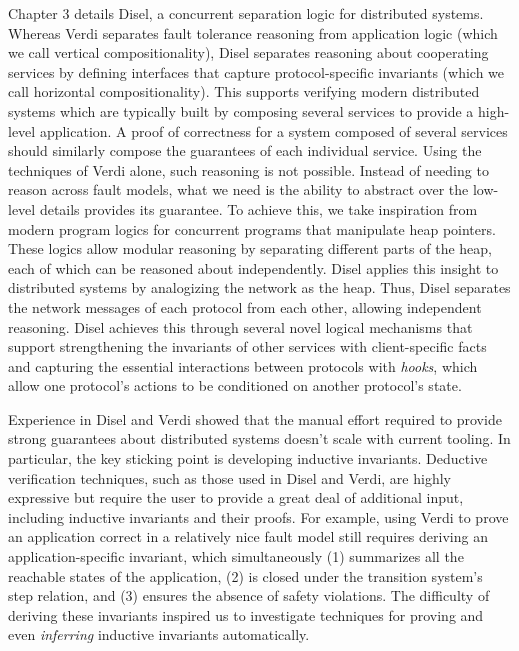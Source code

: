 Chapter 3 details Disel, a concurrent separation logic for distributed
systems.  Whereas Verdi separates fault tolerance reasoning from
application logic (which we call vertical compositionality), Disel
separates reasoning about cooperating services by defining interfaces
that capture protocol-specific invariants (which we call horizontal
compositionality).  This supports verifying modern distributed systems
which are typically built by composing several services to provide a
high-level application.  A proof of correctness for a system composed
of several services should similarly compose the guarantees of each
individual service. Using the techniques of Verdi alone, such reasoning
is not possible. Instead of needing to reason across fault models,
what we need is the ability to abstract over the low-level details
provides its guarantee. To achieve this, we take inspiration from
modern program logics for concurrent programs that manipulate
heap pointers. These logics allow modular reasoning by separating
different parts of the heap, each of which can be reasoned about
independently. Disel applies this insight to distributed systems
by analogizing the network as the heap. Thus, Disel separates
the network messages of each protocol from each other, allowing
independent reasoning. Disel achieves this through several
novel logical mechanisms that support strengthening the invariants
of other services with client-specific facts and capturing the
essential interactions between protocols with \emph{hooks}, which
allow one protocol's actions to be conditioned on another protocol's
state.

Experience in Disel and Verdi showed that the manual effort required
to provide strong guarantees about distributed systems doesn't scale
with current tooling.  In particular, the key sticking point is
developing inductive invariants.  Deductive verification techniques,
such as those used in Disel and Verdi, are highly expressive but
require the user to provide a great deal of additional input,
including inductive invariants and their proofs. For example, using
Verdi to prove an application correct in a relatively nice fault model
still requires deriving an application-specific invariant, which
simultaneously (1) summarizes all the reachable states of the
application, (2) is closed under the transition system's step
relation, and (3) ensures the absence of safety violations.
The difficulty of deriving these invariants inspired us to
investigate techniques for proving and even \emph{inferring}
inductive invariants automatically.

